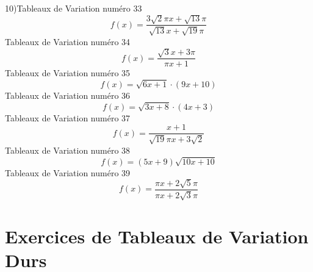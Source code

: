 \documentclass{article}
\begin{document}
10\right)\]Tableaux de Variation num\'ero 33 \[f(x) = \frac{3 \sqrt{2} \pi x + \sqrt{13} \pi}{\sqrt{13} x + \sqrt{19} \pi}\]Tableaux de Variation num\'ero 34 \[f(x) = \frac{\sqrt{3} x + 3 \pi}{\pi x + 1}\]Tableaux de Variation num\'ero 35 \[f(x) = \sqrt{6 x + 1} \cdot \left(9 x + 10\right)\]Tableaux de Variation num\'ero 36 \[f(x) = \sqrt{3 x + 8} \cdot \left(4 x + 3\right)\]Tableaux de Variation num\'ero 37 \[f(x) = \frac{x + 1}{\sqrt{19} \pi x + 3 \sqrt{2}}\]Tableaux de Variation num\'ero 38 \[f(x) = \left(5 x + 9\right) \sqrt{10 x + 10}\]Tableaux de Variation num\'ero 39 \[f(x) = \frac{\pi x + 2 \sqrt{5} \pi}{\pi x + 2 \sqrt{3} \pi}\]
 \section{Exercices de Tableaux de Variation Durs}
\end{document}
